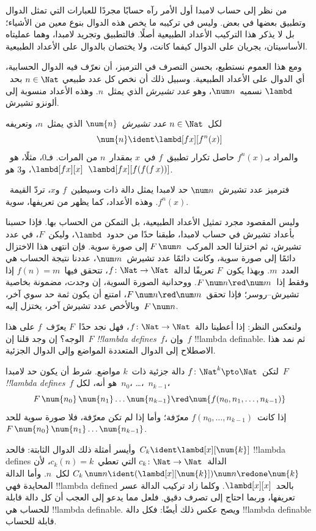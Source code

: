 \documentclass[../../../include/open-logic-section]{subfiles}
\begin{document}

من نظر إلى حساب لامبدا أول الأمر رآه حسابًا مجردًا للعبارات التي تمثل
الدوال وتطبيق بعضها في بعض. وليس في تركيبه ما يخص هذه الدوال بنوع
معين من الأشياء؛ بل لا يذكر هذا التركيب الأعداد الطبيعية أصلًا.
فالتطبيق وتجريد لامبدا، وهما عمليتاه الأساسيتان، يجريان على الدوال
كيفما كانت، ولا يختصان بالدوال على الأعداد الطبيعية.

ومع هذا العموم نستطيع، بحسن التصرف في الترميز، أن نعرّف فيه الدوال
الحسابية، أي الدوال على الأعداد الطبيعية. وسبيل ذلك أن نخص كل عدد طبيعي
$n \in \Nat$ بحد~$\lambd$ نسميه~$\num n$، وهو \emph{عدد تشيرش}
الذي يمثل~$n$. وهذه الأعداد منسوبة إلى ألونزو تشيرش.

\begin{defn}
  لكل~$n \in \Nat$ \emph{عدد تشيرش}~$\num{n}$ الذي يمثل~$n$،
  وتعريفه
  \[
    \num{n} \ident \lambd[fx][f^n(x)]
  \]
  والمراد بـ$f^n(x)$ حاصل تكرار تطبيق~$f$ في~$x$ بمقدار~$n$ من المرات.
  فـ$\num{0}$، مثلًا، هو~$\lambd[fx][x]$، و$\num{3}$
  هو~$\lambd[fx][f(f(f\,x))]$.
\end{defn}
  
فترميز عدد تشيرش~$\num n$ حد لامبدا يمثل دالة ذات وسيطين~$f$ و$x$،
تردّ القيمة~$f^n(x)$. وهذه الأعداد، كما يظهر من تعريفها، سوية.

وليس المقصود مجرد تمثيل الأعداد الطبيعية، بل التمكن من الحساب بها.
فإذا حسبنا بأعداد تشيرش في حساب لامبدا، طبقنا حدًا من حدود~$\lambd$،
وليكن~$F$، في عدد تشيرش، ثم اختزلنا الحد المركب~$F\, \num n$ إلى صورة سوية.
فإن انتهى هذا الاختزال دائمًا إلى صورة سوية، وكانت دائمًا عدد تشيرش~$\num m$،
عددنا نتيجة الحساب هي العدد~$m$.
وبهذا يكون~$F$ تعريفًا لدالة~$f\colon \Nat \to \Nat$،
تتحقق فيها~$f(n) = m$ إذا وفقط إذا~$F\, \num n \red \num m$.
ووحدانية الصورة السوية، إن وجدت، مضمونة بخاصية تشيرش--روسر؛
فإذا تحقق~$F\, \num n \red \num m$، امتنع أن يكون ثمة حد سوي آخر،
وبالأخص عدد تشيرش آخر، يختزل إليه~$F \, \num n$.

ولنعكس النظر: إذا أعطينا دالة~$f\colon \Nat \to \Nat$،
فهل نجد حدًا~$F$ يعرّف~$f$ على هذا الوجه؟
إن وجد قلنا إن~$F$ \emph{!!{lambda define}s}~$f$،
وإن~$f$ !!{lambda definable}. ثم نمد هذا الاصطلاح إلى الدوال
المتعددة المواضع وإلى الدوال الجزئية.

\begin{defn}
لتكن~$f\colon \Nat^k \pto \Nat$ دالة جزئية ذات~$k$ مواضع.
شرط أن يكون حد لامبدا~$F$ \emph{!!{lambda define}s}~$f$ هو أنه،
لكل~$n_0$، \dots،~$n_{k-1}$،
\[
F \, \num{n_0} \, \num{n_1} \dots \num{n_{k-1}} \red \num{f(n_0, n_1, \dots,
  n_{k-1})}
\]
إذا كانت~$f(n_0, \dots, n_{k-1})$ معرّفة؛ وأما إذا لم تكن معرّفة،
فلا صورة سوية للحد~$F \, \num{n_0} \, \num{n_1} \dots \num{n_{k-1}}$.
\end{defn}

وأيسر أمثلة ذلك الدوال الثابتة: فالحد~$C_k \ident
\lambd[x][\num{k}]$ !!{lambda define}s الدالة~$c_k\colon \Nat \to
\Nat$ التي تعطي~$c_k(n) = k$، لأن
$C_k \, \num n \ident (\lambd[x][\num{k}])\num n \redone \num{k}$
لكل~$n$. وأما الدالة المحايدة فهي !!{lambda defined} بالحد~$\lambd[x][x]$.
وكلما زاد تركيب الدالة عسر تعريفها، وربما احتاج إلى تصرف دقيق.
فلعل مما يدعو إلى العجب أن كل دالة قابلة للحساب هي
!!{lambda definable}. ويصح عكس ذلك أيضًا:
فكل دالة !!{lambda definable} قابلة للحساب.
\end{document}
